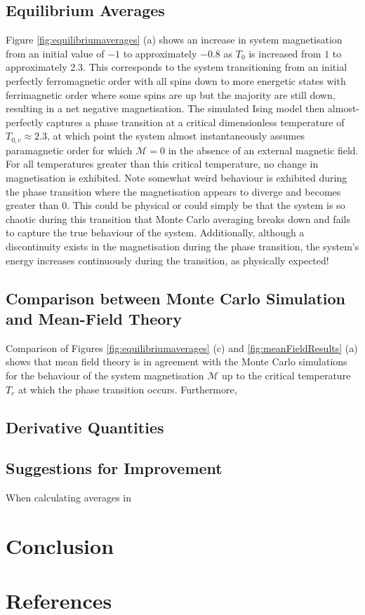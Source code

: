 \documentclass[11pt]{iopart}
\begin{document}
\subsection{Equilibrium Averages}
Figure \ref{fig:equilibriumaverages} (a) shows an increase in system magnetisation from an initial value of $-1$ to approximately $-0.8$ as $T_0$ is increased from $1$ to approximately 2.3. This corresponds to the system transitioning from an initial perfectly ferromagnetic order with all spins down to more energetic states with ferrimagnetic order where some spins are up but the majority are still down, resulting in a net negative magnetisation. The simulated Ising model then almost-perfectly captures a phase transition at a critical dimensionless temperature of $T_{0,c} \approx 2.3$, at which point the system almost instantaneously assumes paramagnetic order for which $\mathcal{M} = 0$ in the absence of an external magnetic field. For all temperatures greater than this critical temperature, no change in magnetisation is exhibited. Note somewhat weird behaviour is exhibited during the phase transition where the magnetisation appears to diverge and becomes greater than 0. This could be physical or could simply be that the system is so chaotic during this transition that Monte Carlo averaging breaks down and fails to capture the true behaviour of the system. Additionally, although a discontinuity exists in the magnetisation during the phase transition, the system's energy increases continuously during the transition, as physically expected!

\subsection{Comparison between Monte Carlo Simulation and Mean-Field Theory}
Comparison of Figures \ref{fig:equilibriumaverages} (c) and \ref{fig:meanFieldResults} (a) shows that mean field theory is in agreement with the Monte Carlo simulations for the behaviour of the system magnetisation $\mathcal{M}$ up to the critical temperature $T_c$ at which the phase transition occurs. Furthermore,

\subsection{Derivative Quantities}
 
 \subsection{Suggestions for Improvement}
 When calculating averages in 
 
\section{Conclusion}

\section*{References}


\end{document}

